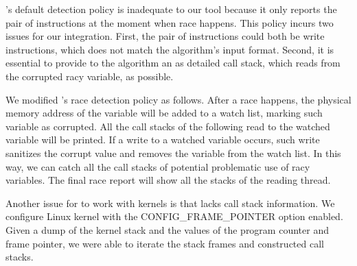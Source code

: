 
\ski's default detection policy is inadequate to our tool because it only reports the
pair of instructions at the moment when race happens. This policy incurs two
issues for our integration. First, the pair of instructions could both be write
instructions, which does not match the algorithm's input format. Second, it is
essential to provide to the algorithm an as detailed call stack, which reads 
from the corrupted racy variable, as possible.

We modified \ski's race detection policy as follows. After a race happens, the
physical memory address of the variable will be added to a \ski watch list,
marking such variable as corrupted. All the call stacks of the following read to
the watched variable will be printed. If a write to a watched variable occurs,
such write sanitizes the corrupt value and removes the variable from the watch
list. In this way, we can catch all the call stacks of potential problematic 
use of racy variables. The final race report will show all the stacks of the 
reading thread.

Another issue for \xxx to work with kernels is that \ski lacks call stack 
information. We configure Linux kernel with the CONFIG\_FRAME\_POINTER option 
enabled. Given a dump of the kernel stack and the values of the program counter 
and frame pointer, we were able to iterate the stack frames and constructed call 
stacks.